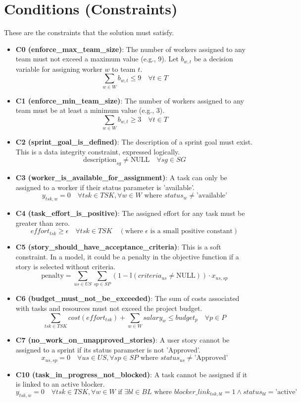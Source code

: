 \documentclass[11pt]{article}
\begin{document}
\section{Conditions (Constraints)}
These are the constraints that the solution must satisfy.
\begin{itemize}
    \item \textbf{C0 (enforce\_max\_team\_size)}: The number of workers assigned to any team must not exceed a maximum value (e.g., 9). Let $b_{w,t}$ be a decision variable for assigning worker $w$ to team $t$.
    $$ \sum_{w \in W} b_{w,t} \leq 9 \quad \forall t \in T $$
    \item \textbf{C1 (enforce\_min\_team\_size)}: The number of workers assigned to any team must be at least a minimum value (e.g., 3).
    $$ \sum_{w \in W} b_{w,t} \geq 3 \quad \forall t \in T $$
    \item \textbf{C2 (sprint\_goal\_is\_defined)}: The description of a sprint goal must exist. This is a data integrity constraint, expressed logically.
    $$ \text{description}_{sg} \neq \text{NULL} \quad \forall sg \in SG $$
    \item \textbf{C3 (worker\_is\_available\_for\_assignment)}: A task can only be assigned to a worker if their status parameter is 'available'.
    $$ y_{tsk, w} = 0 \quad \forall tsk \in TSK, \forall w \in W \text{ where } status_w \neq \text{'available'} $$
    \item \textbf{C4 (task\_effort\_is\_positive)}: The assigned effort for any task must be greater than zero.
    $$ effort_{tsk} \geq \epsilon \quad \forall tsk \in TSK \quad (\text{where } \epsilon \text{ is a small positive constant}) $$
    \item \textbf{C5 (story\_should\_have\_acceptance\_criteria)}: This is a soft constraint. In a model, it could be a penalty in the objective function if a story is selected without criteria.
    $$ \text{penalty} = \sum_{us \in US} \sum_{sp \in SP} (1 - \mathbb{I}(criteria_{us} \neq \text{NULL})) \cdot x_{us, sp} $$
    \item \textbf{C6 (budget\_must\_not\_be\_exceeded)}: The sum of costs associated with tasks and resources must not exceed the project budget.
    $$ \sum_{tsk \in TSK} cost(effort_{tsk}) + \sum_{w \in W} salary_w \leq budget_p \quad \forall p \in P $$
    \item \textbf{C7 (no\_work\_on\_unapproved\_stories)}: A user story cannot be assigned to a sprint if its status parameter is not 'Approved'.
    $$ x_{us, sp} = 0 \quad \forall us \in US, \forall sp \in SP \text{ where } status_{us} \neq \text{'Approved'} $$
    \item \textbf{C10 (task\_in\_progress\_not\_blocked)}: A task cannot be assigned if it is linked to an active blocker.
    $$ y_{tsk, w} = 0 \quad \forall tsk \in TSK, \forall w \in W \text{ if } \exists bl \in BL \text{ where } blocker\_link_{tsk,bl} = 1 \land status_{bl} = \text{'active'} $$
\end{itemize}
\end{document}

